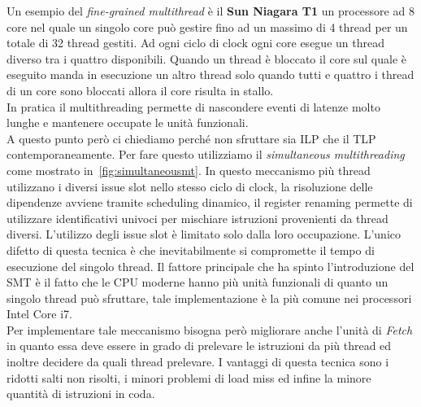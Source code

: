 Un esempio del \emph{fine-grained multithread} è il \textbf{Sun Niagara T1} un processore ad 8 core nel quale un singolo core può gestire fino ad un massimo di 4 thread  per un totale di 32 thread gestiti. Ad ogni ciclo di clock ogni core esegue un thread diverso tra i quattro disponibili. Quando un thread è bloccato il core sul quale è eseguito manda in esecuzione un altro thread solo quando tutti e quattro i thread di un core sono bloccati allora il core risulta in stallo.\\
In pratica il multithreading permette di nascondere eventi di latenze molto lunghe e mantenere occupate le unità funzionali.\\
A questo punto però ci chiediamo perché non sfruttare sia ILP che il TLP contemporaneamente. Per fare questo utilizziamo il \emph{simultaneous multithreading} come mostrato in \figurename\,\ref{fig:simultaneousmt}. In questo meccanismo più thread utilizzano i diversi issue slot nello stesso ciclo di clock, la risoluzione delle dipendenze avviene tramite scheduling dinamico, il register renaming permette di utilizzare identificativi univoci per mischiare istruzioni provenienti da thread diversi. L'utilizzo degli issue slot è limitato solo dalla loro occupazione. L'unico difetto di questa tecnica è che inevitabilmente si compromette il tempo di esecuzione del singolo thread.
Il fattore principale che ha spinto l'introduzione del SMT è il fatto che le CPU moderne hanno più unità funzionali di quanto un singolo thread può sfruttare, tale implementazione è la più comune nei processori Intel Core i7.\\
Per implementare tale meccanismo bisogna però migliorare anche l'unità di \emph{Fetch} in quanto essa deve essere in grado di prelevare le istruzioni da più thread ed inoltre decidere da quali thread prelevare. I vantaggi di questa tecnica sono i ridotti salti non risolti, i minori problemi di load miss ed infine la minore quantità di istruzioni in coda.
